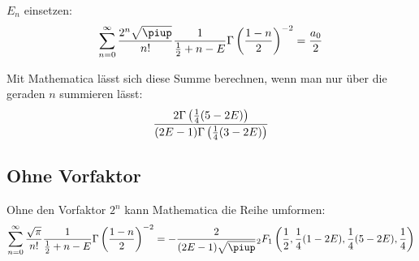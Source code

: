 $E_n$ einsetzen:
\[
    \sum_{n=0}^\infty \frac{2^n \sqrt\piup}{n!} \frac{1}{\frac 12 + n -
    E} \Gamma\del{\frac{1-n}2}^{-2} = \frac{a_0}2
\]

Mit Mathematica lässt sich diese Summe berechnen, wenn man nur über die geraden
$n$ summieren lässt:
\[
    \frac{2 \Gamma\del{\frac 14(5-2E)}}{(2E-1)\Gamma\del{\frac 14(3-2E)}}
\]

\begin{figure}[htbp]
    \centering
    \caption{%
    }
    \label{fig:}
\end{figure}

\subsection{Ohne Vorfaktor}

Ohne den Vorfaktor $2^n$ kann Mathematica die Reihe umformen:
\[
    \sum_{n=0}^\infty \frac{\sqrt\pi}{n!} \frac{1}{\frac 12 + n -
    E} \Gamma\del{\frac{1-n}2}^{-2} = - \frac{2}{(2E-1)\sqrt\piup}
    {_2F_1}\del{\frac 12, \frac 14(1-2E), \frac 14(5-2E), \frac 14}
\]

